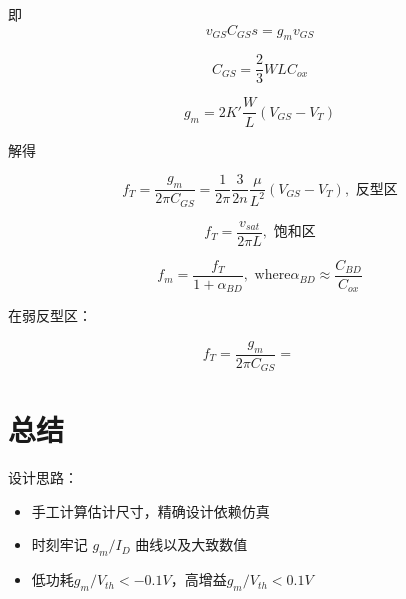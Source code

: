 \documentclass[cn,11pt,chinese,black,simple]{../elegantbook}
\begin{document}
即 \[v_{GS} C_{GS} s = g_m v_{GS}\] 

\[C_{GS} = \frac{2}{3} WL C_{ox}\]

\[g_m = 2 K' \frac{W}{L} (V_{GS} - V_T)\]

解得

\[f_T = \frac{g_m}{2 \pi C_{GS}} = \frac{1}{2 \pi} \frac{3}{2n} \frac{\mu}{L^2}(V_{GS}-V_T), \text{ 反型区}\] 

\[f_T = \frac{v_{sat}}{2 \pi L}, \text{ 饱和区}\]

\[f_m = \frac{f_T}{1 + \alpha_{BD} } ,\text{ where} \alpha_{BD} \approx \frac{C_{BD}}{C_{ox}}\]

在弱反型区：

\[f_T = \frac{g_m}{2\pi C_{GS}} = \begin{aligned}
    & \\
    & 
\end{aligned}\]


\section{总结}

设计思路：

\begin{itemize}
    \item 手工计算估计尺寸，精确设计依赖仿真
    \item 时刻牢记 \(g_m/I_D\) 曲线以及大致数值
    \item 低功耗\(g_m/V_{th} < -0.1 V\)，高增益\(g_m/V_{th} < 0.1 V\)
\end{itemize}


\let\chapname\undefined
\ifx\mainclass\undefined
\end{document}
